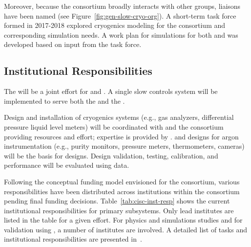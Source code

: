 Moreover, because the  consortium broadly interacts with other groups, liaisons have been named (see Figure~\ref{fig:gen-slow-cryo-org}). 
A short-term task force formed in 2017-2018 explored cryogenics modeling for the consortium and corresponding simulation needs. A work plan for  simulations for both  and  was developed based on input from the task force. 


\subsection{Institutional Responsibilities}
 
 The  %
will be a joint effort for  and . %
A single slow controls system will be implemented to serve both the  and the .

Design and installation of cryogenics systems (e.g., gas analyzers, differential pressure liquid level meters) 
will be coordinated with  and the consortium providing resources and effort; expertise is provided by .  and  designs for argon instrumentation (e.g., purity monitors, pressure meters, thermometers, cameras) will be the basis for  designs. Design validation, testing, calibration, and performance will be evaluated using  data.

Following the conceptual funding model envisioned for the consortium, various responsibilities have been distributed across institutions within the consortium pending final funding decisions.
Table~\ref{tab:cisc-inst-resp} shows the current institutional responsibilities for primary  subsystems. Only lead institutes are listed in the table for a given effort. For physics and simulations studies and for validation using , a number of institutes are involved. A detailed list of tasks and institutional responsibilities are presented in~\cite{bib:docdb5609}.

